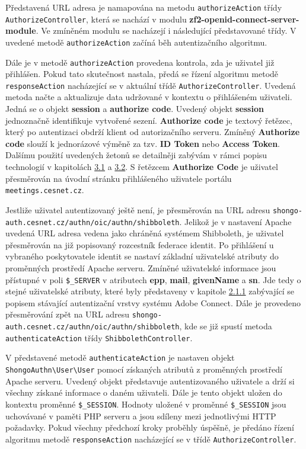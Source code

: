\documentclass[
  printed, %
  twoside, %
  table,   %
  nolof,     %
  nolot,     %
]{fithesis3}
\begin{document}
Představená URL adresa je namapována na metodu \texttt{authorizeAction} třídy \texttt{AuthorizeController}, která se nachází v modulu \textbf{zf2-openid-connect-server-module}. Ve zmíněném modulu  se nacházejí i následující představované třídy. V uvedené metodě \texttt{authorizeAction} začíná běh autentizačního algoritmu. \par 

Dále je v metodě \texttt{authorizeAction} provedena kontrola, zda je uživatel již přihlášen. Pokud tato skutečnost nastala, předá se řízení algoritmu metodě \texttt{responseAction} nacházející se v aktuální třídě \texttt{AuthorizeController}. Uvedená metoda načte a  aktualizuje data udržované v kontextu o přihlášeném uživateli. Jedná se o objekt \textbf{session} a \textbf{authorize code}. Uvedený objekt \textbf{session} jednoznačně identifikuje vytvořené sezení. \textbf{Authorize code} je textový řetězec, který po autentizaci obdrží klient od autorizačního serveru. Zmíněný \textbf{Authorize code} slouží k jednorázové výměně za tzv. \textbf{ID Token} nebo \textbf{Access Token}. Dalšímu použití uvedených žetonů se detailněji zabývám v rámci popisu technologií v kapitolách \hyperref[sec:oauth]{3.1} a \hyperref[sec:oidc]{3.2}. S řetězcem \textbf{Authorize Code} je uživatel přesměrován na úvodní stránku přihlášeného uživatele portálu \texttt{meetings.cesnet.cz}. \par 

Jestliže uživatel autentizovaný ještě není, je přesměrován na URL adresu \texttt{shongo-auth.cesnet.cz/authn/oic/authn/shibboleth}. Jelikož je v nastavení Apache uvedená URL adresa vedena jako chráněná systémem Shibboleth, je uživatel přesměrován na již popisovaný rozcestník federace identit. Po přihlášení u vybraného poskytovatele identit se nastaví základní uživatelské atributy do proměnných prostředí Apache serveru. Zmíněné uživatelské informace jsou přístupné v poli \texttt{\$\_SERVER} v atributech \textbf{epp}, \textbf{mail}, \textbf{givenName} a \textbf{sn}. Jde tedy o stejné uživatelské atributy, které byly představeny v kapitole \hyperref[item:adobe-connect]{2.1.1} zabývající se popisem stávající autentizační vrstvy systému Adobe Connect. Dále je provedeno přesměrování zpět na URL adresu \texttt{shongo-auth.cesnet.cz/authn/oic/authn/shibboleth}, kde se již spustí metoda \texttt{authenticateAction} třídy \texttt{ShibbolethController}. \par

V představené metodě \texttt{authenticateAction} je nastaven objekt \texttt{ShongoAuthn\textbackslash User\textbackslash User} pomocí získaných atributů z proměnných prostředí Apache serveru. Uvedený objekt představuje autentizovaného uživatele a drží si všechny získané informace o daném uživateli. Dále je tento objekt uložen do kontextu proměnné \texttt{\$\_SESSION}. Hodnoty uložené v proměnné \texttt{\$\_SESSION} jsou uchovávané v paměti PHP serveru a jsou sdíleny mezi jednotlivými HTTP požadavky. Pokud všechny předchozí kroky proběhly úspěšně, je předáno řízení algoritmu metodě \texttt{responseAction} nacházející se v třídě \texttt{AuthorizeController}. \par
\end{document}
